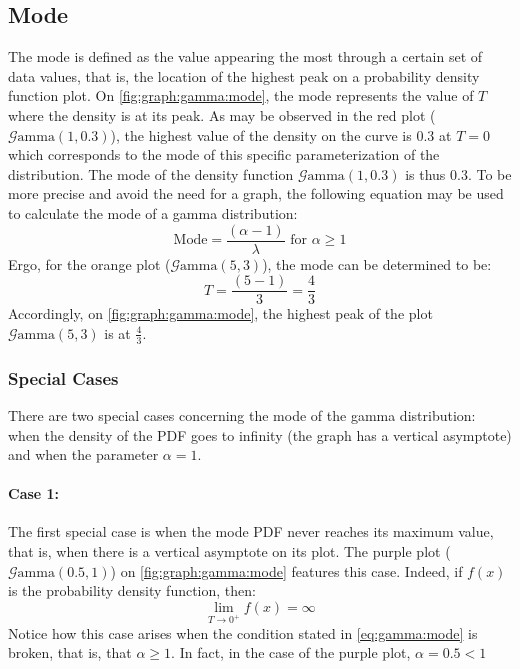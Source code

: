 \documentclass[12pt]{article}
\newcommand{\G}{\mathcal{G}}
\begin{document}

\pagebreak
\subsection{Mode}
The mode is defined as the value appearing the most through a certain set of data values, that is, the location of the
highest peak on a probability density function plot. On \autoref{fig:graph:gamma:mode}, the mode represents the value of
$T$ where the density is at its peak.
As may be observed in the red plot ($\G\text{amma}(1, 0.3)$), the highest value of the density on the curve is $0.3$ at
$T=0$ which corresponds to the mode of this specific parameterization of the distribution. The mode of the density
function $\G\text{amma}(1, 0.3)$ is thus $0.3$. To be more precise and avoid the need for a graph, the following
equation may be used to calculate the mode of a gamma distribution:
\begin{equation}\label{eq:gamma:mode}
	\text{Mode} = \frac{(\alpha-1)}{\lambda}\text{ for }\alpha \geq 1
\end{equation}
Ergo, for the orange plot ($\G\text{amma}(5, 3)$), the mode can be determined to be:
\begin{equation}
	T = \frac{(5-1)}{3} = \frac{4}{3}
\end{equation}
Accordingly, on \autoref{fig:graph:gamma:mode}, the highest peak of the plot $\G\text{amma}(5, 3)$ is at $\frac{4}{3}$.

\subsubsection{Special Cases}
There are two special cases concerning the mode of the gamma distribution: when the density of the PDF goes to infinity
(the graph has a vertical asymptote) and when the parameter $\alpha=1$.

\paragraph{Case 1:}
The first special case is when the mode PDF never reaches its maximum value, that is, when there is a vertical asymptote
on its plot. The purple plot ($\G\text{amma}(0.5, 1)$) on \autoref{fig:graph:gamma:mode} features this case. Indeed, if
$f(x)$ is the probability density function, then:
\begin{equation}
	\lim_{T\to 0^+}f(x)=\infty
\end{equation}
Notice how this case arises when the condition stated in \autoref{eq:gamma:mode} is broken, that is, that $\alpha\geq
1$. In fact, in the case of the purple plot, $\alpha=0.5<1$
\end{document}
